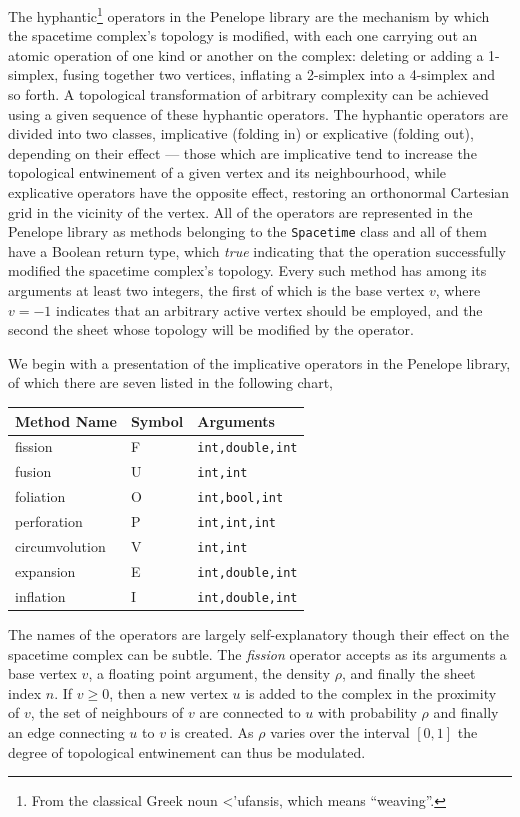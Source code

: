 \documentclass[12pt,letterpaper]{report}
\begin{document}
The hyphantic\footnote{From the classical Greek noun \greektext<'ufansis\latintext, which 
means ``weaving''.} operators in the Penelope library are the mechanism by which the spacetime 
complex's topology is modified, with each one carrying out an atomic operation of one kind or 
another on the complex: deleting or adding a 1-simplex, fusing together two vertices, inflating 
a 2-simplex into a 4-simplex and so forth. A topological transformation of arbitrary complexity 
can be achieved using a given sequence of these hyphantic operators. The hyphantic operators 
are divided into two classes, implicative (folding in) or explicative (folding out), depending on 
their effect --- those which are implicative tend to increase the topological entwinement of a given 
vertex and its neighbourhood, while explicative operators have the opposite effect, restoring an 
orthonormal Cartesian grid in the vicinity of the vertex. All of the operators are represented 
in the Penelope library as methods belonging to the \texttt{Spacetime} class and all of them have 
a Boolean return type, which \emph{true} indicating that the operation successfully modified the 
spacetime complex's topology. Every such method has among its arguments at least two integers, 
the first of which is the base vertex $v$, where $v = -1$ indicates that an arbitrary active 
vertex should be employed, and the second the sheet whose topology will be modified by the 
operator. 

We begin with a presentation of the implicative operators in the Penelope library, of which there 
are seven listed in the following chart,    
\begin{center}
\begin{tabular}{|l|l|l|}
\hline
Method Name & Symbol & Arguments \\ 
\hline \hline
fission & F & \texttt{{int,double,int}} \\
fusion & U & \texttt{{int,int}} \\
foliation & O & \texttt{{int,bool,int}} \\
perforation & P & \texttt{{int,int,int}} \\
circumvolution & V & \texttt{{int,int}} \\ 
expansion & E & \texttt{{int,double,int}} \\ 
inflation & I & \texttt{{int,double,int}} \\ 
\hline
\end{tabular}
\end{center}
The names of the operators are largely self-explanatory though their effect on the spacetime complex 
can be subtle. The \emph{fission} operator accepts as its arguments a base vertex $v$, a floating point 
argument, the density $\rho$, and finally the sheet index $n$. If $v \ge 0$, then a new vertex 
$u$ is added to the complex in the proximity of $v$, the set of neighbours of $v$ are connected to 
$u$ with probability $\rho$ and finally an edge connecting $u$ to $v$ is created. As $\rho$ varies 
over the interval $[0,1]$ the degree of topological entwinement can thus be modulated. 
\end{document}
